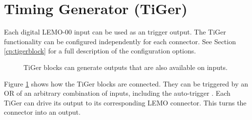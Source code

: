 \section{Timing Generator (TiGer)\label{cp:tiger}}
Each digital LEMO-00 input can be used as an  trigger output. 
The TiGer functionality can be configured independently for each connector. 
See Section \ref{cp:tigerblock} for a full description of the configuration options.
% 
\begin{figure}[ht]
    \begin{center}
        \caption{TiGer blocks can generate outputs that are also available on inputs.\label{fig:matrix}} 
    \end{center}
\end{figure}
%

Figure \ref{fig:matrix} shows how the TiGer blocks are connected. They can be triggered by an OR of an arbitrary combination of inputs, 
including the auto-trigger . Each TiGer can drive its output to its corresponding LEMO connector. This turns the connector into an output. 

